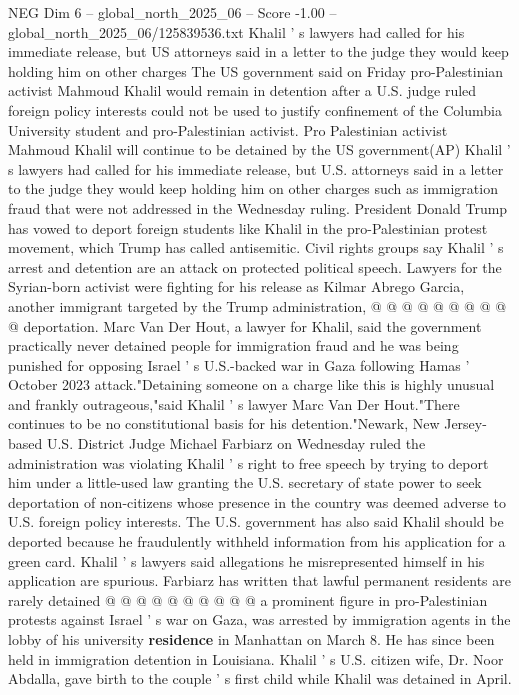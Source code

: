 \begin{textsample}{NEG Dim 6 – global\_north\_2025\_06 – Score -1.00 – global\_north\_2025\_06/125839536.txt}  \label{ex:f6_neg_430}
Khalil ' s lawyers had called for his immediate release, but US attorneys said in a letter to the judge they would keep holding him on other charges The US government said on Friday pro-Palestinian activist Mahmoud Khalil would remain in detention after a U.S. judge ruled foreign policy interests could not be used to justify confinement of the Columbia University student and pro-Palestinian activist.
Pro Palestinian activist Mahmoud Khalil will continue to be detained by the US government(AP) Khalil ' s lawyers had called for his immediate release, but U.S. attorneys said in a letter to the judge they would keep holding him on other charges such as immigration fraud that were not addressed in the Wednesday ruling.
President Donald Trump has vowed to deport foreign students like Khalil in the pro-Palestinian protest movement, which Trump has called antisemitic.
Civil rights groups say Khalil ' s arrest and detention are an attack on protected political speech.
Lawyers for the Syrian-born activist were fighting for his release as Kilmar Abrego Garcia, another immigrant targeted by the Trump administration, @ @ @ @ @ @ @ @ @ @ deportation.
Marc Van Der Hout, a lawyer for Khalil, said the government practically never detained people for immigration fraud and he was being punished for opposing Israel ' s U.S.-backed war in Gaza following Hamas ' October 2023 attack."Detaining someone on a charge like this is highly unusual and frankly outrageous,"said Khalil ' s lawyer Marc Van Der Hout."There continues to be no constitutional basis for his detention."Newark, New Jersey-based U.S.
District Judge Michael Farbiarz on Wednesday ruled the administration was violating Khalil ' s right to free speech by trying to deport him under a little-used law granting the U.S. secretary of state power to seek deportation of non-citizens whose presence in the country was deemed adverse to U.S. foreign policy interests.
The U.S. government has also said Khalil should be deported because he fraudulently withheld information from his application for a green card.
Khalil ' s lawyers said allegations he misrepresented himself in his application are spurious.
Farbiarz has written that lawful permanent residents are rarely detained @ @ @ @ @ @ @ @ @ @ a prominent figure in pro-Palestinian protests against Israel ' s war on Gaza, was arrested by immigration agents in the lobby of his university \textbf{residence} in Manhattan on March 8.
He has since been held in immigration detention in Louisiana.
Khalil ' s U.S. citizen wife, Dr.
Noor Abdalla, gave birth to the couple ' s first child while Khalil was detained in April.

\end{textsample}
